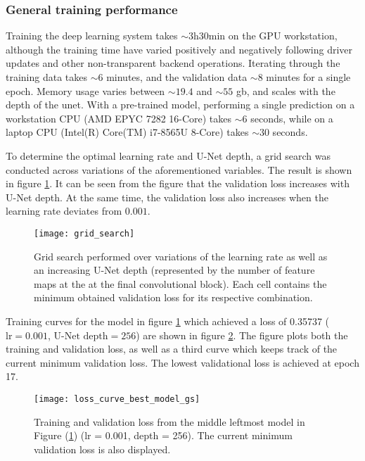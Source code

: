 \documentclass[../main/thesis]{subfiles}
\begin{document}
\subsubsection{General training performance}
Training the deep learning system takes $\sim 3\text{h}30\text{min}$ on the GPU workstation, although the training time have varied positively and negatively following driver updates and other non-transparent backend operations. Iterating through the training data takes $\sim 6$ minutes, and the validation data $\sim 8$ minutes for a single epoch. Memory usage varies between $\sim19.4$ and $\sim55$ gb, and scales with the depth of the unet. With a pre-trained model, performing a single prediction on a workstation CPU (AMD EPYC 7282 16-Core) takes $\sim 6$ seconds, while on a laptop CPU (Intel(R) Core(TM) i7-8565U 8-Core) takes $\sim 30$ seconds.

To determine the optimal learning rate and U-Net depth, a grid search was conducted across variations of the aforementioned variables. The result is shown in figure \ref{fig:gs}. It can be seen from the figure that the validation loss increases with U-Net depth. At the same time, the validation loss also increases when the learning rate deviates from $0.001$.

\begin{figure}
    \centering
    \texttt{[image: grid\_search]}
    \caption{\label{fig:gs}Grid search performed over variations of the learning rate as well as an increasing U-Net depth (represented by the number of feature maps at the at the final convolutional block). Each cell contains the minimum obtained validation loss for its respective combination.}
\end{figure}

Training curves for the model in figure \ref{fig:gs} which achieved a loss of 0.35737 ($\text{lr} = 0.001$, $\text{U-Net depth} = 256$) are shown in figure \ref{fig:loss_curve_from_gs}. The figure plots both the training and validation loss, as well as a third curve which keeps track of the current minimum validation loss. The lowest validational loss is achieved at epoch 17. 

\begin{figure}
    \centering
    \texttt{[image: loss\_curve\_best\_model\_gs]}
    \caption{\label{fig:loss_curve_from_gs}Training and validation loss from the middle leftmost model in Figure (\ref{fig:gs}) (lr = 0.001, depth = 256). The current minimum validation loss is also displayed.}
\end{figure}
\end{document}
